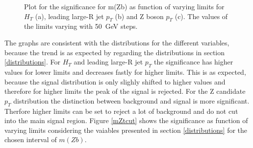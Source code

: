 \begin{figure}[h]
    \centering
    \centering
    \centering
    \caption{Plot for the significance for m(Zb) as function of varying limits for $H_{T}$ (a), leading large-R jet $p_{T}$ (b) and Z boson $p_{T}$ (c).
    The values of the limits varying with \SI{50}{GeV} steps.}
    \label{mZbcut}   
\end{figure}
    


The graphs are consistent with the distributions for the different variables, because the trend is as expected by regarding the distributions in section \ref{distributions}.
For $H_{T}$ and leading large-R jet $p_{T}$ the significance has higher values for lower limits and decreases fastly for higher limits.
This is as expected, because the signal distribution is only slighly shifted to higher values and therefore for higher limits the peak of the signal is rejected.
For the Z candidate $p_{T}$ distribution the distinction between background and signal is more significant.
Therfore higher limits can be set to reject a lot of background and do not cut into the main signal region.
Figure \ref{mZtcut} shows the significance as function of varying limits considering the vaiables presented in section \ref{distributions} for the chosen interval of $m(Zb)$.

\newpage

